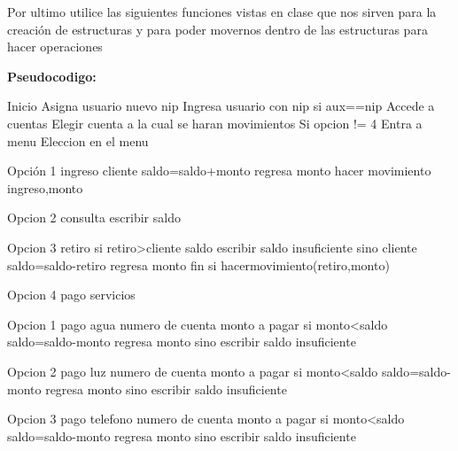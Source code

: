 \documentclass{article}
\begin{document}
\begin{multicols}{2}
 Por ultimo utilice las siguientes funciones vistas en clase que nos sirven para la creación de estructuras y para poder movernos dentro de las estructuras para hacer operaciones 
\begin{center}
    \textbf{Pseudocodigo:}
\end{center}

Inicio 
    Asigna usuario nuevo nip 
    Ingresa usuario con nip 
    si aux==nip
    Accede a cuentas
        Elegir cuenta a la cual se haran movimientos 
            Si opcion != 4
                Entra a menu
                    Eleccion en el menu

                    Opción 1 ingreso
                        cliente saldo=saldo+monto
                        regresa monto 
                        hacer movimiento ingreso,monto

                    Opcion 2 consulta 
                        escribir saldo

                    Opcion 3 retiro
                        si retiro>cliente saldo
                        escribir saldo insuficiente 
                        sino 
                        cliente saldo=saldo-retiro
                        regresa monto
                        fin si
                        hacermovimiento(retiro,monto)
                
                    Opcion 4 pago servicios
                        
                        Opcion 1 pago agua
                            numero de cuenta
                            monto a pagar
                            si monto<saldo
                            saldo=saldo-monto
                            regresa monto 
                            sino 
                            escribir saldo insuficiente
                        
                        Opcion 2 pago luz
                            numero de cuenta
                            monto a pagar
                            si monto<saldo
                            saldo=saldo-monto
                            regresa monto 
                            sino 
                            escribir saldo insuficiente
    
                        Opcion 3 pago telefono 
                            numero de cuenta
                            monto a pagar
                            si monto<saldo
                            saldo=saldo-monto
                            regresa monto 
                            sino 
                            escribir saldo insuficiente
                        

\end{multicols}
\end{document}
